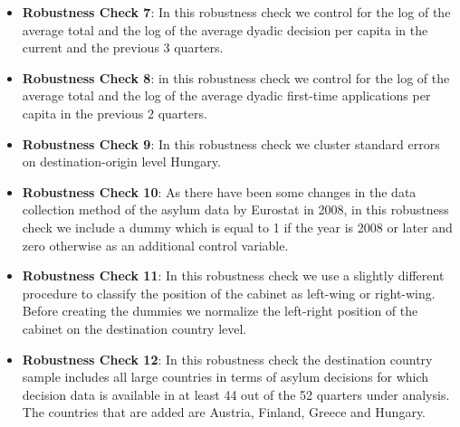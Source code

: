 \documentclass[11pt,a4paper]{scrartcl}
\begin{document}
\begin{itemize}
	\item \textbf{Robustness Check 7}: In this robustness check we control for the log of the average total and the log of the average dyadic decision per capita in the current and the previous 3 quarters.
	
	\item \textbf{Robustness Check 8}: in this robustness check we control for the log of the average total and the log of the average dyadic first-time applications per capita in the previous 2 quarters.
	
	\item \textbf{Robustness Check 9}: In this robustness check we cluster standard errors on destination-origin level Hungary.  
	
	\item \textbf{Robustness Check 10}: As there have been some changes in the data collection method of the asylum data by Eurostat in 2008, in this robustness check we include a dummy which is equal to 1 if the year is 2008 or later and zero otherwise as an additional control variable. 

	\item \textbf{Robustness Check 11}: In this robustness check we use a slightly different procedure to classify the position of the cabinet as left-wing or right-wing. Before creating the dummies we normalize the left-right position of the cabinet on the destination country level.

	\item \textbf{Robustness Check 12}: In this robustness check the destination country sample includes all large countries in terms of asylum decisions for which decision data is available in at least 44 out of the 52 quarters under analysis. The countries that are added are Austria, Finland, Greece and Hungary. 
	 
\end{itemize}	
	
%
%
%
%	
%
%
%
\end{document}
